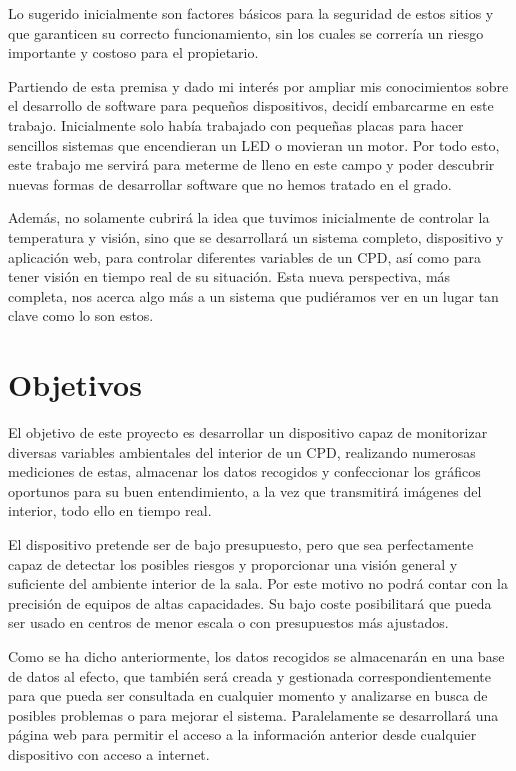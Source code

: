 Lo sugerido inicialmente son factores básicos para la seguridad de estos sitios y que garanticen su correcto funcionamiento, sin los cuales se correría un riesgo importante y costoso para el propietario.

Partiendo de esta premisa y dado mi interés por ampliar mis conocimientos sobre el desarrollo de software para pequeños dispositivos, decidí embarcarme en este trabajo. Inicialmente solo había trabajado con pequeñas placas para hacer sencillos sistemas que encendieran un LED o movieran un motor. Por todo esto, este trabajo me servirá para meterme de lleno en este campo y poder descubrir nuevas formas de desarrollar software que no hemos tratado en el grado.

Además, no solamente cubrirá la idea que tuvimos inicialmente de controlar la temperatura y visión, sino que se desarrollará un sistema completo, dispositivo y aplicación web, para controlar diferentes variables de un CPD, así como para tener visión en tiempo real de su situación. Esta nueva perspectiva, más completa, nos acerca algo más a un sistema que pudiéramos ver en un lugar tan clave como lo son estos.

\section{Objetivos}\label{sec:objetivos}
El objetivo de este proyecto es desarrollar un dispositivo capaz de monitorizar diversas variables ambientales del interior de un CPD, realizando numerosas mediciones de estas, almacenar los datos recogidos y confeccionar los gráficos oportunos para su buen entendimiento, a la vez que transmitirá imágenes del interior, todo ello en tiempo real.

El dispositivo pretende ser de bajo presupuesto, pero que sea perfectamente capaz de detectar los posibles riesgos y proporcionar una visión general y suficiente del ambiente interior de la sala. Por este motivo no podrá contar con la precisión de equipos de altas capacidades. Su bajo coste posibilitará que pueda ser usado en centros de menor escala o con presupuestos más ajustados.

Como se ha dicho anteriormente, los datos recogidos se almacenarán en una base de datos al efecto, que también será creada y gestionada correspondientemente para que pueda ser consultada en cualquier momento y analizarse en busca de posibles problemas o para mejorar el sistema. Paralelamente se desarrollará una página web para permitir el acceso a la información anterior desde cualquier dispositivo con acceso a internet.

